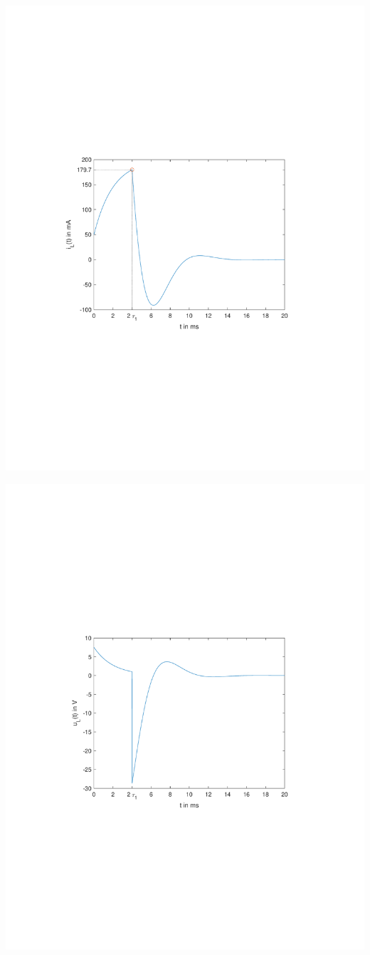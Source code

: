 \documentclass[11pt]{scrartcl}
\begin{document}
\begin{center}

  \includegraphics[width=0.70\linewidth]{./Assets/ML_Strom_Plot.pdf}
  \label{fig:ML_Strom_Plot}
\end{center}

\begin{center}

  \includegraphics[width=0.70\linewidth]{./Assets/ML_Spannung_Plot.pdf}
  \label{fig:ML_Spannung_Plot}
\end{center}
\end{document}
